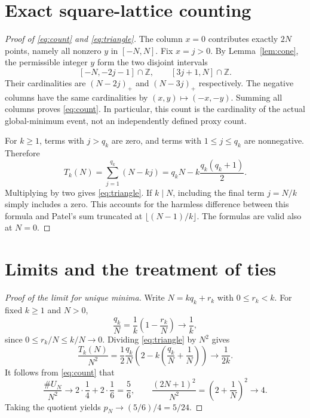 \documentclass[11pt]{article}
\newcommand{\Z}{\mathbb Z}
\newcommand{\pos}[1]{(#1)_{+}}
\begin{document}
\section{Exact square-lattice counting}
\begin{proof}[Proof of \eqref{eq:count} and \eqref{eq:triangle}]
The column $x=0$ contributes exactly $2N$ points, namely all nonzero $y$ in $[-N,N]$. Fix $x=j>0$. By Lemma~\ref{lem:cone}, the permissible integer $y$ form the two disjoint intervals
\[
 [-N,-2j-1]\cap\Z,\qquad [3j+1,N]\cap\Z.
\]
Their cardinalities are $\pos{N-2j}$ and $\pos{N-3j}$ respectively. The negative columns have the same cardinalities by $(x,y)\mapsto(-x,-y)$. Summing all columns proves \eqref{eq:count}. In particular, this count is the cardinality of the actual global-minimum event, not an independently defined proxy count.

For $k\ge1$, terms with $j>q_k$ are zero, and terms with $1\le j\le q_k$ are nonnegative. Therefore
\[
 T_k(N)=\sum_{j=1}^{q_k}(N-kj)
       =q_kN-k\frac{q_k(q_k+1)}2.
\]
Multiplying by two gives \eqref{eq:triangle}. If $k\mid N$, including the final term $j=N/k$ simply includes a zero. This accounts for the harmless difference between this formula and Patel's sum truncated at $\lfloor(N-1)/k\rfloor$. The formulas are valid also at $N=0$.
\end{proof}

\section{Limits and the treatment of ties}
\begin{proof}[Proof of the limit for unique minima]
Write $N=kq_k+r_k$ with $0\le r_k<k$. For fixed $k\ge1$ and $N>0$,
\[
 \frac{q_k}{N}=\frac1k\left(1-\frac{r_k}{N}\right)
 \longrightarrow\frac1k,
\]
since $0\le r_k/N\le k/N\to0$. Dividing \eqref{eq:triangle} by $N^2$ gives
\[
 \frac{T_k(N)}{N^2}=
 \frac12\frac{q_k}{N}\left(2-k\left(\frac{q_k}{N}+\frac1N\right)\right)
 \longrightarrow\frac1{2k}.
\]
It follows from \eqref{eq:count} that
\[
 \frac{\#U_N}{N^2}\longrightarrow
 2\cdot\frac14+2\cdot\frac16=\frac56,
 \qquad
 \frac{(2N+1)^2}{N^2}=\left(2+\frac1N\right)^2\longrightarrow4.
\]
Taking the quotient yields $p_N\to(5/6)/4=5/24$.
\end{proof}
\end{document}
